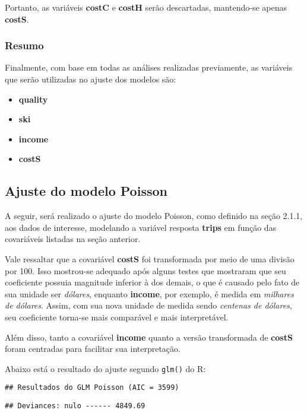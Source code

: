 \documentclass[
  twocolumn]{article}
\providecommand{\tightlist}{%
  \setlength{\itemsep}{0pt}\setlength{\parskip}{0pt}}
\begin{document}
Portanto, as variáveis \textbf{costC} e \textbf{costH} serão
descartadas, mantendo-se apenas \textbf{costS}.

\subsubsection{Resumo}\label{resumo}

Finalmente, com base em todas as análises realizadas previamente, as
variáveis que serão utilizadas no ajuste dos modelos são:

\begin{itemize}
\tightlist
\item
  \textbf{quality}
\item
  \textbf{ski}
\item
  \textbf{income}
\item
  \textbf{costS}
\end{itemize}

\subsection{Ajuste do modelo Poisson}\label{ajuste-do-modelo-poisson}

A seguir, será realizado o ajuste do modelo Poisson, como definido na
seção 2.1.1, aos dados de interesse, modelando a variável resposta
\textbf{trips} em função das covariáveis listadas na seção anterior.

Vale ressaltar que a covariável \textbf{costS} foi transformada por meio
de uma divisão por 100. Isso mostrou-se adequado após alguns testes que
mostraram que seu coeficiente possuia magnitude inferior à dos demais, o
que é causado pelo fato de sua unidade ser \emph{dólares}, enquanto
\textbf{income}, por exemplo, é medida em \emph{milhares de dólares}.
Assim, com sua nova unidade de medida sendo \emph{centenas de dólares},
seu coeficiente torna-se mais comparável e mais interpretável.

Além disso, tanto a covariável \textbf{income} quanto a versão
transformada de \textbf{costS} foram centradas para facilitar sua
interpretação.

Abaixo está o resultado do ajuste segundo \texttt{glm()} do R:

\begin{verbatim}
## Resultados do GLM Poisson (AIC = 3599)
\end{verbatim}

\begin{verbatim}
## Deviances: nulo ------ 4849.69
\end{verbatim}
\end{document}
